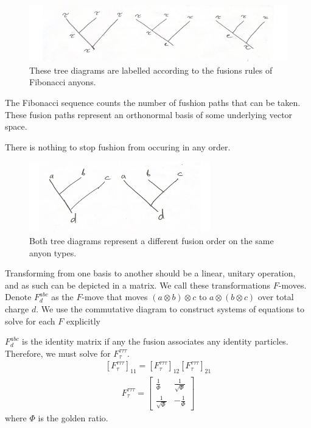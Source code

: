 \documentclass[compress,aspectratio=169,10pt,usenames,dvipsnames]{beamer}
\begin{document}
\begin{frame}
\vfill
\begin{figure}[H]
	\centering
	\includegraphics[width=1\textwidth]{treebasis.png}
	\caption{These tree diagrams are labelled according to the fusions rules of Fibonacci anyons.}
\end{figure}
\vfill
The Fibonacci sequence counts the number of fushion paths that can be taken. These fusion paths represent an orthonormal basis of some underlying vector space.
\end{frame}


\begin{frame}
\vfill
There is nothing to stop fushion from occuring in any order.
\vfill
\begin{figure}[H]
	\centering
	\includegraphics[width=0.7\textwidth]{differentftb}
	\caption{Both tree diagrams represent a different fusion order on the same anyon types.}
\end{figure}
\vfill
Transforming from one basis to another should be a linear, unitary operation, and as such can be depicted in a matrix. We call these transformations $F$-moves. Denote $F^{abc}_d$ as the $F$-move that moves $(a\otimes b)\otimes c$ to $a\otimes(b\otimes c)$ over total charge $d$.
\vfill
We use the commutative diagram to construct systems of equations to solve for each $F$ explicitly
\end{frame}
%
%
\begin{frame}
\vfill
$F^{abc}_d$ is the identity matrix if any the fusion associates any identity particles. Therefore, we must solve for $F^{\tau\tau\tau}_\tau$.
\vfill
\begin{equation}\begin{aligned}
[F^{\tau\tau\tau}_\tau]_{11} = [F^{\tau\tau\tau}_\tau]_{12}[F^{\tau\tau\tau}_\tau]_{21}
\end{aligned}\end{equation}
\vfill
\begin{equation}
	\begin{aligned}
		F^{\tau\tau\tau}_\tau = \begin{bmatrix}
									\frac{1}{\Phi} & \frac{1}{\sqrt{\Phi}}\\
									\frac{1}{\sqrt{\Phi}} & -\frac{1}{\Phi}
								\end{bmatrix}
	\end{aligned}
\end{equation}
where $\Phi$ is the golden ratio.
\vfill
\end{frame}
\end{document}
